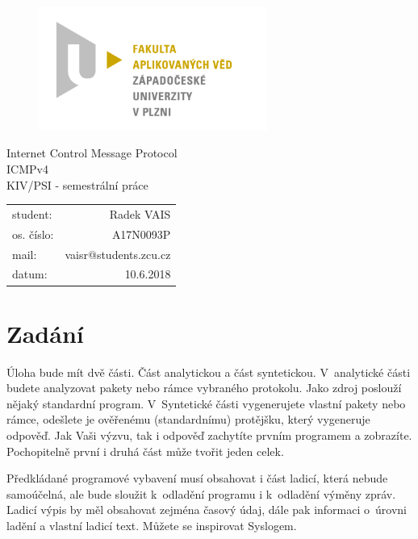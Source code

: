 \documentclass[12pt, a4paper]{article}
\begin{document}
\begin{figure}[h!]
\centering
\includegraphics[bb= 0 0 820 445 , width=75mm]{favlogo.jpg}
\end{figure}

{\centering
{\huge Internet Control Message Protocol}\\[1em]
{\large ICMPv4}\\[1em]
{\large KIV/PSI - semestrální práce}\\[11,5cm]
}

\begin{tabular}{l r}
student: & Radek VAIS\\
os. číslo: & A17N0093P\\
mail: & vaisr@students.zcu.cz\\
datum: & 10.6.2018\\
\end{tabular}

\thispagestyle{empty}
\newpage

\section{Zadání} %

Úloha bude mít dvě části. Část analytickou a část syntetickou. V~analytické části budete analyzovat pakety nebo rámce vybraného protokolu. Jako zdroj poslouží nějaký standardní program. V~Syntetické části vygenerujete vlastní pakety nebo rámce, odešlete je ověřenému (standardnímu) protějšku, který vygeneruje odpověď. Jak Vaši výzvu, tak i odpověď zachytíte prvním programem a zobrazíte. Pochopitelně první i druhá část může tvořit jeden celek.

Předkládané programové vybavení musí obsahovat i část ladicí, která nebude samoúčelná, ale bude sloužit k~odladění programu i k~odladění výměny zpráv. Ladicí výpis by měl obsahovat zejména časový údaj, dále pak informaci o~úrovni ladění a vlastní ladicí text. Můžete se inspirovat Syslogem.
\end{document}

